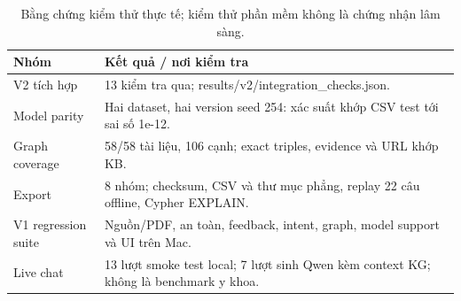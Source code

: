 \par\FloatBarrier\begin{table}[H]\centering\small{}\setlength{\tabcolsep}{5pt}
\caption{Bằng chứng kiểm thử thực tế; kiểm thử phần mềm không là chứng nhận lâm sàng.}\begin{tabular}{P{5.4cm}P{8.5cm}}\toprule
Nhóm & Kết quả / nơi kiểm tra\\\midrule
V2 tích hợp & 13 kiểm tra qua; results/v2/integration\_checks.json.\\
Model parity & Hai dataset, hai version seed 254: xác suất khớp CSV test tới sai số 1e-12.\\
Graph coverage & 58/58 tài liệu, 106 cạnh; exact triples, evidence và URL khớp KB.\\
Export & 8 nhóm; checksum, CSV và thư mục phẳng, replay 22 câu offline, Cypher EXPLAIN.\\
V1 regression suite & Nguồn/PDF, an toàn, feedback, intent, graph, model support và UI trên Mac.\\
Live chat & 13 lượt smoke test local; 7 lượt sinh Qwen kèm context KG; không là benchmark y khoa.\\\bottomrule\end{tabular}\end{table}
